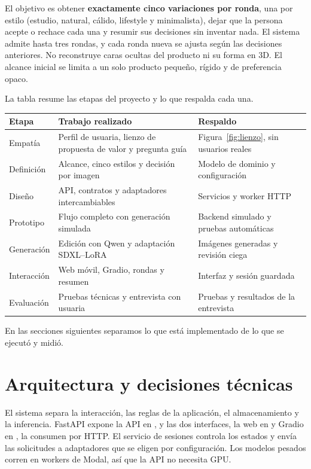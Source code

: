 \documentclass[11pt,a4paper]{article}
\newcommand{\ruta}[1]{{\small\texttt{\detokenize{#1}}}}
\begin{document}
El objetivo es obtener \textbf{exactamente cinco variaciones por ronda}, una por estilo (estudio, natural, cálido, lifestyle y minimalista), dejar que la persona acepte o rechace cada una y resumir sus decisiones sin inventar nada. El sistema admite hasta tres rondas, y cada ronda nueva se ajusta según las decisiones anteriores. No reconstruye caras ocultas del producto ni su forma en 3D. El alcance inicial se limita a un solo producto pequeño, rígido y de preferencia opaco.

La tabla resume las etapas del proyecto y lo que respalda cada una.

\begin{table}[h]\centering\small
\begin{tabularx}{\linewidth}{@{}p{2.8cm}YY@{}}\toprule
Etapa & Trabajo realizado & Respaldo \\\midrule
Empatía & Perfil de usuaria, lienzo de propuesta de valor y pregunta guía & Figura~\ref{fig:lienzo}, sin usuarios reales \\
Definición & Alcance, cinco estilos y decisión por imagen & Modelo de dominio y configuración \\
Diseño & API, contratos y adaptadores intercambiables & Servicios y worker HTTP \\
Prototipo & Flujo completo con generación simulada & Backend simulado y pruebas automáticas \\
Generación & Edición con Qwen y adaptación SDXL--LoRA & Imágenes generadas y revisión ciega \\
Interacción & Web móvil, Gradio, rondas y resumen & Interfaz y sesión guardada \\
Evaluación & Pruebas técnicas y entrevista con usuaria & Pruebas y resultados de la entrevista \\\bottomrule
\end{tabularx}
\end{table}
En las secciones siguientes separamos lo que está implementado de lo que se ejecutó y midió.

\clearpage
\section{Arquitectura y decisiones técnicas}
El sistema separa la interacción, las reglas de la aplicación, el almacenamiento y la inferencia. FastAPI expone la API en \ruta{/api/v1}, y las dos interfaces, la web en \ruta{/app} y Gradio en \ruta{/ui}, la consumen por HTTP. El servicio de sesiones controla los estados y envía las solicitudes a adaptadores que se eligen por configuración. Los modelos pesados corren en workers de Modal, así que la API no necesita GPU.
\end{document}
